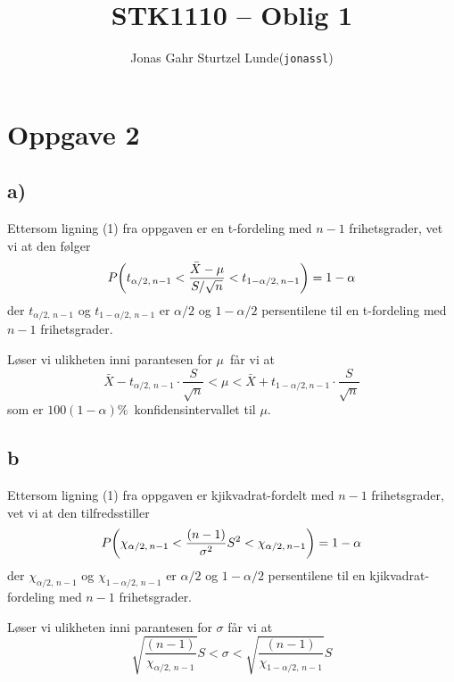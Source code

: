 \documentclass[12p,a4paper]{article}
\begin{document}
\title{STK1110 -- Oblig 1}
\author{
    \begin{tabular}{r l}
        Jonas Gahr Sturtzel Lunde & (\texttt{jonassl})
    \end{tabular}}

\maketitle

\hspace{10cm}

\section*{Oppgave 2}
\subsection*{a)}
Ettersom ligning (1) fra oppgaven er en t-fordeling med $n-1$ frihetsgrader, vet vi at den følger
\begin{equation}
    P\qty(t_{\alpha/2,\, n-1} < \frac{\bar{X} - \mu}{S/\sqrt{n}} < t_{1-\alpha/2,\, n-1}) = 1-\alpha
\end{equation}
der $t_{\alpha/2,\, n-1}$ og $t_{1-\alpha/2,\, n-1}$ er $\alpha/2$ og $1-\alpha/2$ persentilene til en t-fordeling med $n-1$ frihetsgrader. 

Løser vi ulikheten inni parantesen for $\mu$ får vi at
\begin{equation*}
    \bar{X} - t_{\alpha/2,\, n-1}\cdot\frac{S}{\sqrt{n}} < \mu < \bar{X} + t_{1 - \alpha/2, n-1}\cdot\frac{S}{\sqrt{n}}
\end{equation*}
som er $100(1-\alpha)\%$ konfidensintervallet til $\mu$.


\subsection*{b}
Ettersom ligning (1) fra oppgaven er kjikvadrat-fordelt med $n-1$ frihetsgrader, vet vi at den tilfredsstiller
\begin{equation}
    P\qty(\chi_{\alpha/2,\, n-1} < \frac{(n-1)}{\sigma^2}S^2 < \chi_{\alpha/2,\, n-1}) = 1 - \alpha
\end{equation}
der $\chi_{\alpha/2,\, n-1}$ og $\chi_{1-\alpha/2,\, n-1}$ er $\alpha/2$ og $1-\alpha/2$ persentilene til en kjikvadrat-fordeling med $n-1$ frihetsgrader. 

Løser vi ulikheten inni parantesen for $\sigma$ får vi at
\begin{equation}
    \sqrt{\frac{(n-1)}{\chi_{\alpha/2,\, n-1}}}S < \sigma < \sqrt{\frac{(n-1)}{\chi_{1-\alpha/2,\, n-1}}}S
\end{equation}
\end{document}
